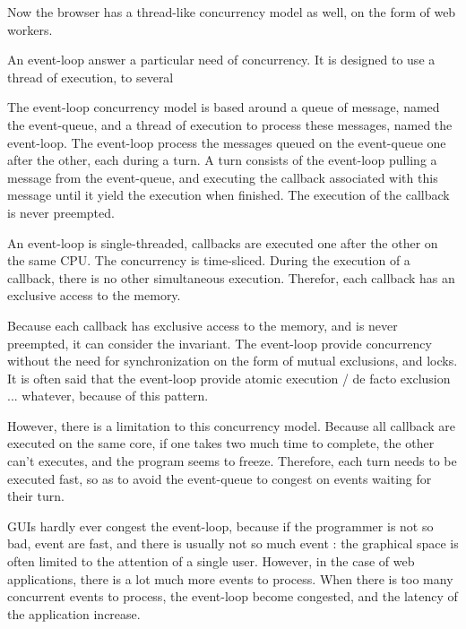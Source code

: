 Now the browser has a thread-like concurrency model as well, on the form of web workers.



An event-loop answer a particular need of concurrency.
It is designed to use a thread of execution, to several 

The event-loop concurrency model is based around a queue of message, named the event-queue, and a thread of execution to process these messages, named the event-loop.
The event-loop process the messages queued on the event-queue one after the other, each during a turn.
A turn consists of the event-loop pulling a message from the event-queue, and executing the callback associated with this message until it yield the execution when finished.
The execution of the callback is never preempted.

An event-loop is single-threaded, callbacks are executed one after the other on the same CPU.
The concurrency is time-sliced.
During the execution of a callback, there is no other simultaneous execution.
Therefor, each callback has an exclusive access to the memory.

Because each callback has exclusive access to the memory, and is never preempted, it can consider the invariant.
The event-loop provide concurrency without the need for synchronization on the form of mutual exclusions, and locks.
It is often said that the event-loop provide atomic execution / de facto exclusion ... whatever, because of this pattern.

However, there is a limitation to this concurrency model.
Because all callback are executed on the same core, if one takes two much time to complete, the other can't executes, and the program seems to freeze.
Therefore, each turn needs to be executed fast, so as to avoid the event-queue to congest on events waiting for their turn.

GUIs hardly ever congest the event-loop, because if the programmer is not so bad, event are fast, and there is usually not so much event : the graphical space is often limited to the attention of a single user.
However, in the case of web applications, there is a lot much more events to process.
When there is too many concurrent events to process, the event-loop become congested, and the latency of the application increase.

